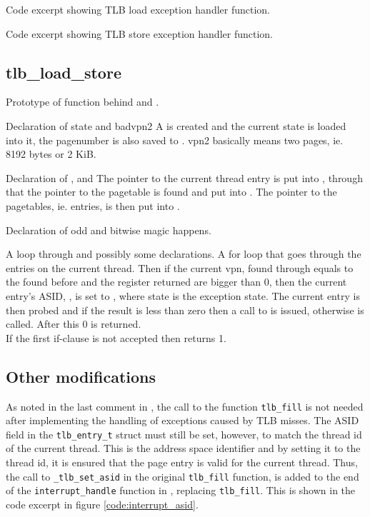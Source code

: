 {Code excerpt showing TLB load exception handler function.}

{Code excerpt showing TLB store exception handler function.}


\subsection{tlb\_load\_store}
    {Prototype of function behind  and
                          .}

    {Declaration of state and badvpn2}
A  is created and the current state is loaded
into it, the pagenumber is also saved to . vpn2
basically means two pages, ie. 8192 bytes or 2 KiB.


    {Declaration of ,  and }
The pointer to the current thread entry is put into , through
that the pointer to the pagetable is found and put into . The
pointer to the pagetables, ie. entries, is then put into .

    {Declaration of odd and bitwise magic happens.}

    {A loop through  and possibly some declarations.}
A for loop that goes through the entries on the current thread. Then if the
current vpn, found through  equals to the 
found before and the register returned are bigger than 0, then the current entry's ASID,
, is set to , where state is the
exception state. The current entry is then probed and if the result is less than
zero then a call to  is issued, otherwise
 is called. After this 0 is returned. \\
If the first if-clause is not accepted then 
returns 1.

\subsection{Other modifications}
As noted in the last comment in , the call to the
function \verb|tlb_fill| is not needed after implementing the handling of
exceptions caused by TLB misses. The ASID field in the \verb|tlb_entry_t| struct
must still be set, however, to match the thread id of the current thread. This
is the address space identifier and by setting it to the thread id, it is
ensured that the page entry is valid for the current thread. Thus, the call to
\verb|_tlb_set_asid| in the original \verb|tlb_fill| function, is added to the
end of the \verb|interrupt_handle| function in ,
replacing \verb|tlb_fill|. This is shown in the code excerpt in figure
\ref{code:interrupt_asid}.

